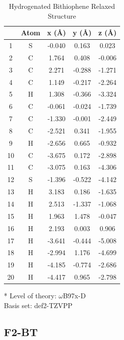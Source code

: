 \begin{table}[hbt!]\centering
\caption{Hydrogenated Bithiophene Relaxed Structure}
\renewcommand{\arraystretch}{1.5}
\begin{threeparttable}
\begin{tabular}{ccccc}\toprule
{} & {Atom} & {x (\AA)} & {y (\AA)} & {z (\AA)} \\ \midrule
    1 & S & -0.040 & 0.163 & 0.023\\
    2 & C & 1.764 & 0.408 & -0.006\\
    3 & C & 2.271 & -0.288 & -1.271\\
    4 & C & 1.149 & -0.217 & -2.264\\
    5 & H & 1.308 & -0.366 & -3.324\\
    6 & C & -0.061 & -0.024 & -1.739\\
    7 & C & -1.330 & -0.001 & -2.449\\
    8 & C & -2.521 & 0.341 & -1.955\\
    9 & H & -2.656 & 0.665 & -0.932\\
    10 & C & -3.675 & 0.172 & -2.898\\
    11 & C & -3.075 & 0.163 & -4.306\\
    12 & S & -1.396 & -0.522 & -4.142\\
    13 & H & 3.183 & 0.186 & -1.635\\
    14 & H & 2.513 & -1.337 & -1.068\\
    15 & H & 1.963 & 1.478 & -0.047\\
    16 & H & 2.193 & 0.003 & 0.906\\
    17 & H & -3.641 & -0.444 & -5.008\\
    18 & H & -2.994 & 1.176 & -4.699\\
    19 & H & -4.185 & -0.774 & -2.686\\
    20 & H & -4.417 & 0.965 & -2.798\\
 \bottomrule
\end{tabular}
\begin{tablenotes}
\item[*] \footnotesize Level of theory: $\omega$B97x-D \\ Basis set: def2-TZVPP
\end{tablenotes}
\end{threeparttable}
\end{table}

\clearpage
\subsection{F2-BT}

